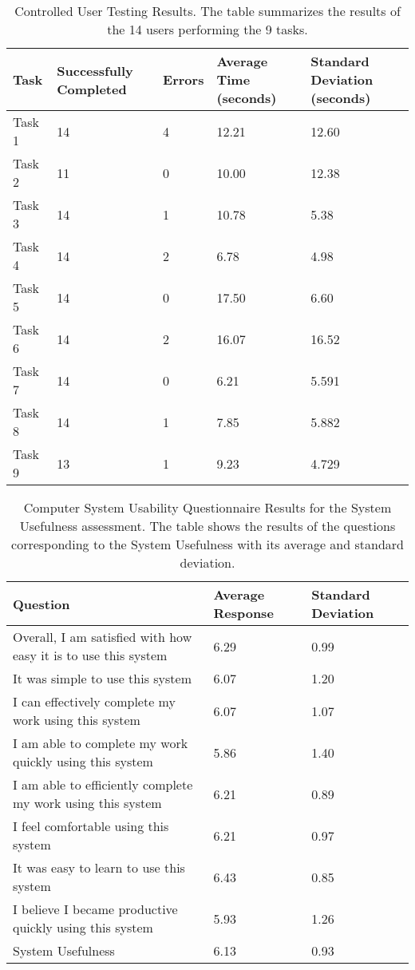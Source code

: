 \documentclass[twocolumn]{bmcart}%
\begin{document}
\begin{backmatter}
\begin{table}[h!]
\caption{Controlled User Testing Results. The table summarizes the results of the 14 users performing the 9 tasks.}
      \begin{tabular}{lC{1.5cm}C{0.75cm}R{1.2cm}R{1.2cm}}
      \hline
      Task & Successfully Completed & Errors & Average Time (seconds) & Standard Deviation (seconds)\\ \hline
      Task 1 & 14 & 4 & 12.21	&	12.60 \\
      Task 2 & 11 & 0 & 10.00	&	12.38 \\
      Task 3 & 14 & 1 & 10.78 &  5.38 \\
      Task 4 & 14 & 2 &  6.78	&  4.98 \\
      Task 5 & 14 & 0 & 17.50	&  6.60 \\
      Task 6 & 14 & 2 & 16.07	& 16.52 \\
      Task 7 & 14 & 0 &  6.21	& 5.591 \\
      Task 8 & 14 & 1 &  7.85	& 5.882 \\
      Task 9 & 13 & 1 &  9.23	& 4.729 \\ \hline
      \end{tabular}
\label{tbl:tasksResults}
\end{table}

\begin{table}[h!]
\caption{Computer System Usability Questionnaire Results for the System Usefulness assessment. The table shows the results of the questions corresponding to the System Usefulness with its average and standard deviation.}
      \begin{tabular}{L{3.85cm}R{1.2cm}R{1.2cm}}
      \hline
      Question & Average Response & Standard Deviation \\ \hline
      Overall, I am satisfied with how easy it is to use this system & 6.29 & 0.99 \\
      It was simple to use this system & 6.07 & 1.20 \\
      I can effectively complete my work using this system & 6.07 & 1.07 \\
      I am able to complete my work quickly using this system & 5.86 & 1.40 \\
      I am able to efficiently complete my work using this system & 6.21 & 0.89 \\
      I feel comfortable using this system & 6.21 & 0.97 \\
      It was easy to learn to use this system & 6.43 & 0.85 \\
      I believe I became productive quickly using this system & 5.93 & 1.26 \\ \hline
      System Usefulness & 6.13 & 0.93 \\ \hline
      \end{tabular}
\label{tbl:CSUQSystemUsefulnessResults}
\end{table}


\end{backmatter}
\end{document}
